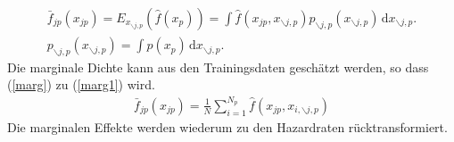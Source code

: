 \begin{align}
	\bar{f}_{jp}(x_{jp}) = E_{x_{\backslash j,p}}(\hat{f}(x_p)) = \int \! \hat{f}(x_{jp},x_{\backslash j,p}) p_{\backslash j,p}(x_{\backslash j,p}) \, \mathrm{d}x_{\backslash j,p}. \label{marg} \\
	p_{\backslash j,p}(x_{\backslash j,p}) = \int \! p(x_p) \, \mathrm{d}x_{\backslash j,p}.
\end{align}
Die marginale Dichte kann aus den Trainingsdaten geschätzt werden, so dass (\ref{marg}) zu (\ref{marg1}) wird.
\begin{align}
	\bar{f}_{jp}(x_{jp}) = \frac{1}{N} \sum_{i=1}^{N_p} \hat{f}(x_{jp},x_{i,\backslash j,p}) \label{marg1}
\end{align}
Die marginalen Effekte werden wiederum zu den Hazardraten rücktransformiert.
